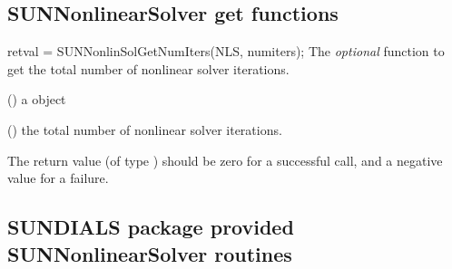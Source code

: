 \subsection{SUNNonlinearSolver get functions}
\label{ss:sunnonlinsol_getfn}
{
  retval = SUNNonlinSolGetNumIters(NLS, numiters);
}
{
  The \textit{optional} function  to get
  the total number of nonlinear solver iterations.
}
{
  \begin{args}[numiters]
  \item[NLS] ()
    a {\sunnonlinsol} object
  \item[numiters] ()
    the total number of nonlinear solver iterations.
  \end{args}
}
{
  The return value  (of type ) should be zero for a
  successful call, and a negative value for a failure.
}
{}


\subsection{SUNDIALS package provided SUNNonlinearSolver routines}
\label{ss:sunnonlinsol_sunsuppliedfn}

